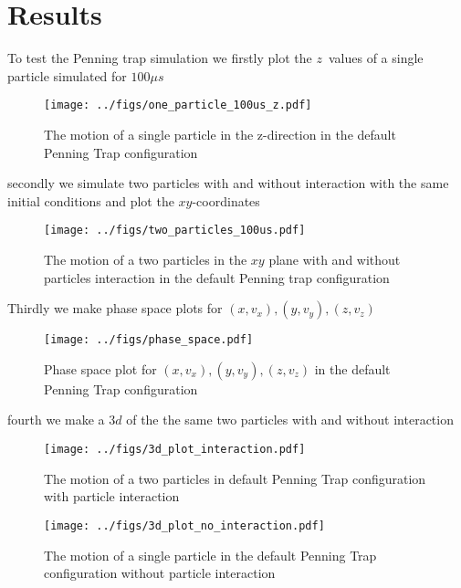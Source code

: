 \documentclass[english,notitlepage,reprint,nofootinbib]{revtex4-1}  %
\begin{document}
\section{Results}\label{sec:results}
%
To test the Penning trap simulation we firstly plot the $z$ values of a single particle simulated for $100 \mu s$

\begin{figure}[h!]
	\centering
	\texttt{[image: ../figs/one\_particle\_100us\_z.pdf]} %
	\caption{The motion of a single particle in the z-direction in the default Penning Trap configuration}
	\label{fig:100us-z}
\end{figure}

secondly we simulate two particles with and without interaction with the same initial conditions and plot the $xy$-coordinates

\begin{figure}[h!]
	\centering
	\texttt{[image: ../figs/two\_particles\_100us.pdf]} %
	\caption{The motion of a two particles in the $xy$ plane with and without particles interaction in the default Penning trap configuration}
	\label{fig:particles_xy}
\end{figure}

Thirdly we make phase space plots for $(x, v_x), (y, v_y), (z, v_z)$

\begin{figure}[h!]
	\centering
	\texttt{[image: ../figs/phase\_space.pdf]} %
	\caption{Phase space plot for $(x, v_x), (y, v_y), (z, v_z)$ in the default Penning Trap configuration}
	\label{fig:phase}
\end{figure}

fourth we make a $3d$ of the the same two particles with and without interaction

\begin{figure}[h!]
	\centering
	\texttt{[image: ../figs/3d\_plot\_interaction.pdf]} %
	\caption{The motion of a two particles in default Penning Trap configuration with particle interaction}
	\label{fig:3di}
\end{figure}

\begin{figure}[h!]
	\centering
	\texttt{[image: ../figs/3d\_plot\_no\_interaction.pdf]} %
	\caption{The motion of a single particle in the default Penning Trap configuration without particle interaction}
	\label{fig:3dni}
\end{figure}
\end{document}

